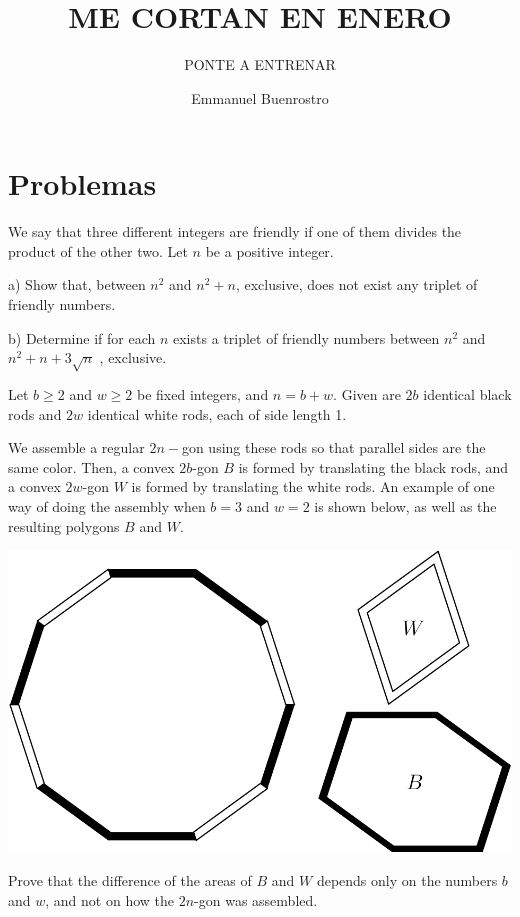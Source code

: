 \documentclass[11pt]{scrartcl}
\title{ME CORTAN EN ENERO }
\subtitle{PONTE A ENTRENAR}
\author{Emmanuel Buenrostro}
\begin{document}
\maketitle

\section{Problemas}
\begin{problem}
We say that three different integers are friendly if one of them divides the product of the other two. Let $n$ be a positive integer.

a) Show that, between $n^2$ and $n^2+n$, exclusive, does not exist any triplet of friendly numbers.

b) Determine if for each $n$ exists a triplet of friendly numbers between $n^2$ and $n^2+n+3\sqrt{n}$ , exclusive.
\end{problem}
\begin{problem}[USAMO 2022/2]
    	Let $b\geq2$ and $w\geq2$ be fixed integers, and $n=b+w$. Given are $2b$ identical black rods and $2w$ identical white rods, each of side length 1.

We assemble a regular $2n-$gon using these rods so that parallel sides are the same color. Then, a convex $2b$-gon $B$ is formed by translating the black rods, and a convex $2w$-gon $W$ is formed by translating the white rods. An example of one way of doing the assembly when $b=3$ and $w=2$ is shown below, as well as the resulting polygons $B$ and $W$.

\begin{center}
\includegraphics[scale=0.5]{USAMO2022_2.png}
\end{center}
Prove that the difference of the areas of $B$ and $W$ depends only on the numbers $b$ and $w$, and not on how the $2n$-gon was assembled.
\end{problem}
\end{document}
